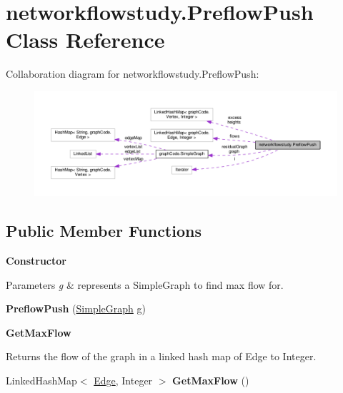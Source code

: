\hypertarget{classnetworkflowstudy_1_1PreflowPush}{}\section{networkflowstudy.\+Preflow\+Push Class Reference}
\label{classnetworkflowstudy_1_1PreflowPush}


Collaboration diagram for networkflowstudy.\+Preflow\+Push\+:\nopagebreak
\begin{figure}[H]
\begin{center}
\leavevmode
\includegraphics[width=350pt]{classnetworkflowstudy_1_1PreflowPush__coll__graph}
\end{center}
\end{figure}
\subsection*{Public Member Functions}
\begin{Indent}{\bf Constructor}\par
{\em 
\begin{DoxyParams}{Parameters}
{\em g} & represents a Simple\+Graph to find max flow for. \\
\hline
\end{DoxyParams}
}\begin{DoxyCompactItemize}
\item 
{\bfseries Preflow\+Push} (\hyperlink{classgraphCode_1_1SimpleGraph}{Simple\+Graph} g)\hypertarget{classnetworkflowstudy_1_1PreflowPush_a509ad952e5697ec0ad3109bc09b97e50}{}\label{classnetworkflowstudy_1_1PreflowPush_a509ad952e5697ec0ad3109bc09b97e50}

\end{DoxyCompactItemize}
\end{Indent}
\begin{Indent}{\bf Get\+Max\+Flow}\par
{\em \begin{DoxyReturn}{Returns}
the flow of the graph in a linked hash map of Edge to Integer. 
\end{DoxyReturn}
}\begin{DoxyCompactItemize}
\item 
Linked\+Hash\+Map$<$ \hyperlink{classgraphCode_1_1Edge}{Edge}, Integer $>$ {\bfseries Get\+Max\+Flow} ()\hypertarget{classnetworkflowstudy_1_1PreflowPush_abd0c41b475ef9df44b22a0fe4c31474a}{}\label{classnetworkflowstudy_1_1PreflowPush_abd0c41b475ef9df44b22a0fe4c31474a}

\end{DoxyCompactItemize}
\end{Indent}


